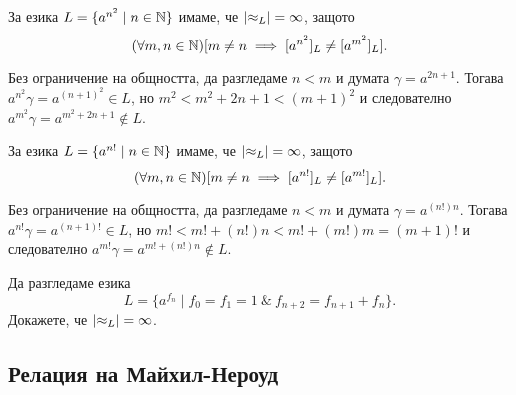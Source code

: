 \begin{example}
  За езика $L = \{a^{n^2} \mid n \in \mathbb{N}\}$ имаме, че $\lvert{\approx_L}\rvert = \infty$,
  защото \[(\forall m,n\in\mathbb{N})[m \neq n \implies [a^{n^2}]_L \neq [a^{m^2}]_L].\]
  
  Без ограничение на общността, да разгледаме $n < m$ и думата $\gamma = a^{2n+1}$.
  Тогава $a^{n^2}\gamma = a^{(n+1)^2} \in L$, но 
  $m^2 < m^2 + 2n + 1 < (m+1)^2$ и следователно $a^{m^2}\gamma = a^{m^2+2n+1}\not\in L$.
\end{example}

\begin{example}
  За езика $L = \{a^{n!} \mid n \in \mathbb{N}\}$ имаме, че $\lvert{\approx_L}\rvert = \infty$,
  защото \[(\forall m,n\in\mathbb{N})[m \neq n \implies [a^{n!}]_L \neq [a^{m!}]_L].\]
  
  Без ограничение на общността, да разгледаме $n < m$ и думата $\gamma = a^{(n!)n}$.
  Тогава $a^{n!}\gamma = a^{(n+1)!} \in L$, но 
  $m! < m! + (n!)n < m! + (m!)m = (m+1)!$ и следователно $a^{m!}\gamma = a^{m!+(n!)n}\not\in L$.
\end{example}

\begin{problem}
  Да разгледаме езика
  \[L = \{a^{f_n} \mid f_0 = f_1 = 1\ \&\ f_{n+2} = f_{n+1} + f_{n}\}.\]
  Докажете, че $\lvert{\approx_L}\rvert = \infty$.
\end{problem}


\subsection{Релация на Майхил-Нероуд}

